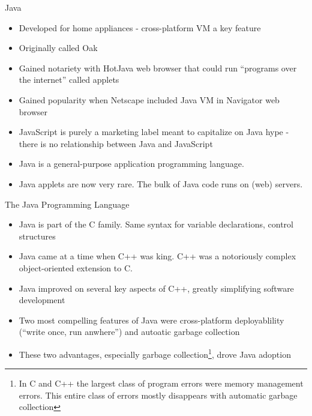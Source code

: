 \documentclass{beamer}
\author[Chris Simpkins] 
{Christopher Simpkins \\\texttt{chris.simpkins@gatech.edu}}
\institute[Georgia Tech] %
\date[CS 1331]{}
\begin{document}
\begin{frame}
  \titlepage
\end{frame}

\begin{frame}[fragile]{Java}

\begin{itemize}
\item Developed for home appliances - cross-platform VM a key feature
\item Originally called Oak
\item Gained notariety with HotJava web browser that could run ``programs over the internet'' called applets
\item Gained popularity when Netscape included Java VM in Navigator web browser
\item JavaScript is purely a marketing label meant to capitalize on Java hype - there is no relationship between Java and JavaScript
\item  Java is a general-purpose application programming language.  
\item Java applets are now very rare.  The bulk of Java code runs on (web) servers.
\end{itemize}

\end{frame}

\begin{frame}[fragile]{The Java Programming Language}


\begin{itemize}
\item Java is part of the C family.  Same syntax for variable
  declarations, control structures
\item Java came at a time when C++ was king.  C++ was a notoriously complex
  object-oriented extension to C.
\item Java improved on several key aspects of C++, greatly simplifying
  software development
\item Two most compelling features of Java were cross-platform
  deployablility (``write once, run anwhere'') and autoatic garbage
  collection
\item These two advantages, especially garbage collection\footnote{In
    C and C++ the largest class of program errors were memory
    management errors.  This entire class of errors mostly disappears
    with automatic garbage collection}, drove Java adoption
\end{itemize}

\end{frame}
\end{document}
